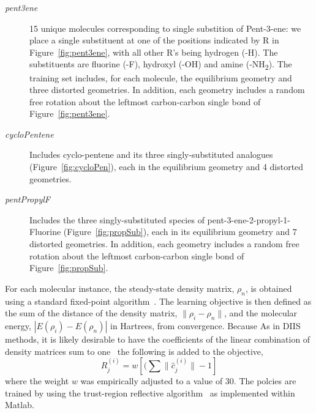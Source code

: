\documentclass[twoside,11pt]{article}
\begin{document}
\begin{description}
\item[\textit{pent3ene}] 15 unique molecules corresponding to single substition of Pent-3-ene: we place a single substituent at one of the positions indicated by R in Figure~\ref{fig:pent3ene}, with all other R's being hydrogen (-H). The substituents are fluorine (-F), hydroxyl (-OH) and amine (-NH\textsubscript{2}). The training set includes, for each molecule, the equilibrium geometry and three distorted geometries. In addition, each geometry includes a random free rotation about the leftmost carbon-carbon single bond of Figure~\ref{fig:pent3ene}. 
\item[\textit{cycloPentene}]Includes cyclo-pentene and its three singly-substituted analogues (Figure~\ref{fig:cycloPen}), each in the equilibrium geometry and 4 distorted geometries. 
\item[\textit{pentPropylF}] Includes the three singly-substituted species of pent-3-ene-2-propyl-1-Fluorine (Figure~\ref{fig:propSub}), each in its equilibrium geometry and 7 distorted geometries. In addition, each geometry includes a random free rotation about the leftmost carbon-carbon single bond of Figure~\ref{fig:propSub}. 
\end{description}

For each molecular instance, the steady-state density matrix, $\rho_n$, is obtained using a standard fixed-point algorithm~\citep{Pulay1980}. The learning objective is then defined as the sum of the distance of the density matrix, $\|\rho_i-\rho_n\|$, and the molecular energy, $|E(\rho_i)-E(\rho_n)|$ in Hartrees, from convergence. Because As in DIIS methods, it is likely desirable to have the coefficients of the linear combination of density matrices sum to one~\cite{scusceria} the following is added to the objective,
\begin{equation}
R^{(i)}_j =  w [(\sum \|\hat{c}^{(i)}_j\| - 1]
\end{equation}
where the weight $w$ was empirically adjusted to a value of 30.
The polcies are trained by using the trust-region reflective algorithm~\cite{Coleman1996} as implemented within Matlab.~\cite{Matlab} 
\end{document}
